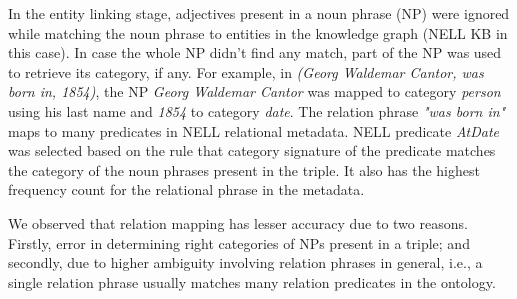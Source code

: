 In the entity linking stage, adjectives present in a noun phrase (NP) were ignored while matching the noun phrase to entities in the knowledge graph (NELL KB in this case). In case the whole NP didn't find any match, part of the NP was used to retrieve its category, if any. For example, in \textit{(Georg Waldemar Cantor, was born in, 1854)}, the NP  \textit{Georg Waldemar Cantor} was mapped to category \textit{person} using his last name and \textit{1854} to category \textit{date}. The relation phrase \textit{"was born in"} maps to many predicates in NELL relational metadata. NELL predicate \textit{AtDate} was selected based on the rule that category signature of the predicate matches the category of the noun phrases present in the triple. It also has the highest frequency count for the relational phrase in the metadata.

We observed that relation mapping has lesser accuracy due to two reasons. Firstly, error in determining right categories of NPs present in a triple; and secondly, due to higher ambiguity involving relation phrases in general, i.e., a single relation phrase usually matches many relation predicates in the ontology.




